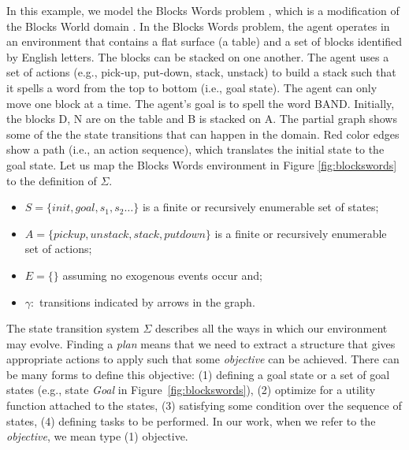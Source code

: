 In this example, we model the Blocks Words problem \cite{ramirez2009plan}, which is a modification of the Blocks World domain \cite{gupta1992bw}. In the Blocks Words problem, the agent operates in an environment that contains a flat surface (a table) and a set of blocks identified by English letters. The blocks can be stacked on one another. The agent uses a set of actions (e.g., pick-up, put-down, stack, unstack) to build a stack such that it spells a word from the top to bottom (i.e., goal state). The agent can only move one block at a time. The agent's goal is to spell the word BAND. Initially, the blocks D, N are on the table and B is stacked on A. The partial graph shows some of the the state transitions that can happen in the domain. Red color edges show a path (i.e., an action sequence), which translates the initial state to the goal state. Let us map the Blocks Words environment in Figure \ref{fig:blockswords} to the definition of $\Sigma$.
\begin{itemize}
\item $S = \lbrace init, goal, s_1, s_2 \ldots \rbrace$ is a finite or recursively enumerable set of states;
\item $A = \lbrace pickup, unstack, stack, putdown \rbrace$ is a finite or recursively enumerable set of actions;
\item $E = \lbrace \rbrace$ assuming no exogenous events occur and;
\item $\gamma:$ transitions indicated by arrows in the graph.
\end{itemize} 


The state transition system $\Sigma$ describes all the ways in which our environment may evolve. Finding a \textit{plan} means that we need to extract a structure that gives appropriate actions to apply such that some \textit{objective} can be achieved. There can be many forms to define this objective: (1) defining a goal state or a set of goal states (e.g., state \textit{Goal} in Figure~\ref{fig:blockswords}), (2) optimize for a utility function attached to the states, (3) satisfying some condition over the sequence of states, (4) defining tasks to be performed. In our work, when we refer to the \textit{objective}, we mean type (1) objective.

